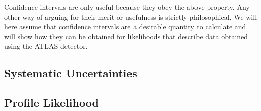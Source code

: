 Confidence intervals are only useful because they obey the above property.
Any other way of arguing for their merit or usefulness is strictly philosophical.
We will here assume that confidence intervals are a desirable quantity to calculate and will show how they can be obtained for likelihoods that describe data obtained using the ATLAS detector.

\subsection{Systematic Uncertainties}



\subsection{Profile Likelihood}


